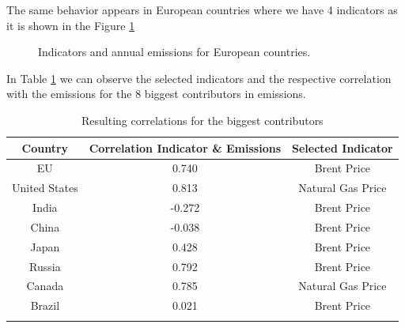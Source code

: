 The same behavior appears in European countries where we have 4 indicators as it is shown in the Figure \ref{fig:indicators_Denmark_Portugal}
\begin{figure}[h!]
	\centering
	\caption{Indicators and annual emissions for European countries.}
	\label{fig:indicators_Denmark_Portugal}
\end{figure}

In Table \ref{table:correlation} we can observe the selected indicators and the respective correlation with the emissions for the 8 biggest contributors in emissions.
\begin{table}[h!]
	\centering
	\begin{tabular}{ccc}
		\hline
		Country & Correlation Indicator \& Emissions & Selected Indicator \\
		\hline
		\hline 
		EU & 0.740 & Brent Price \\
		United States & 0.813 & Natural Gas Price \\
		India & -0.272 & Brent Price \\
		China & -0.038 &  Brent Price \\
		Japan &  0.428 & Brent Price \\
		Russia & 0.792 & Brent Price \\
		Canada & 0.785 & Natural Gas Price \\
		Brazil & 0.021 & Brent Price\\
		\hline 
		&& \\
	\end{tabular}
	\caption{Resulting correlations for the biggest contributors}
	\label{table:correlation}  
\end{table}

